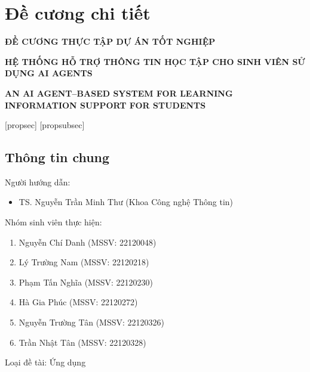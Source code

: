 \chapter*{Đề cương chi tiết}
\label{proposal}

\begin{refsection}

\begin{center}
    \large\bfseries ĐỀ CƯƠNG THỰC TẬP DỰ ÁN TỐT NGHIỆP \\[0.8cm]

    {\large\bfseries HỆ THỐNG HỖ TRỢ THÔNG TIN HỌC TẬP CHO SINH VIÊN SỬ DỤNG AI AGENTS\par}
    \vspace{.6cm}

    {\large\bfseries AN AI AGENT--BASED SYSTEM FOR LEARNING INFORMATION SUPPORT FOR STUDENTS\par}
\end{center}

\vspace{.5cm}

[propsec]
[propsubsec]
\renewcommand{\thepropsubsec}{\thepropsec.\arabic{propsubsec}}
\renewcommand{\thepropsubsubsec}{\thepropsubsec.\arabic{propsubsubsec}}

\section*{\thepropsec\quad Thông tin chung}

Người hướng dẫn:
\begin{itemize}
    \item TS. Nguyễn Trần Minh Thư (Khoa Công nghệ Thông tin)
\end{itemize}

Nhóm sinh viên thực hiện:
\begin{enumerate}
    \item Nguyễn Chí Danh (MSSV: 22120048)
    \item Lý Trường Nam (MSSV: 22120218)
    \item Phạm Tấn Nghĩa (MSSV: 22120230)
    \item Hà Gia Phúc (MSSV: 22120272)
    \item Nguyễn Trường Tân (MSSV: 22120326)
    \item Trần Nhật Tân (MSSV: 22120328)
\end{enumerate}

Loại đề tài: Ứng dụng


\end{refsection}
